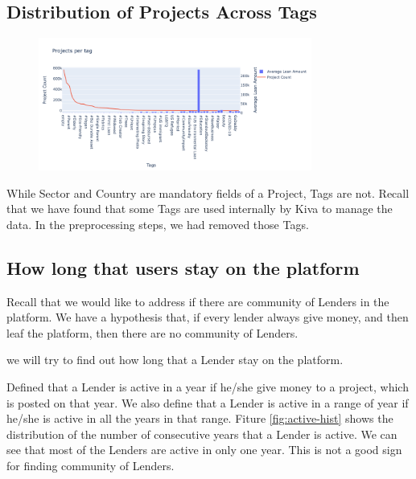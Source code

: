 \subsection{Distribution of Projects Across Tags}

\begin{figure}[H]
	\centering
	\includegraphics[width=0.8\textwidth]{images/project-vs-tag.png}
	\caption{}
	\label{fig:project-vs-tag}
\end{figure}



While Sector and Country are mandatory fields of a Project, Tags are not.
Recall that we have found that some Tags are used internally by Kiva to manage the data.
In the preprocessing steps, we had removed those Tags.


\subsection{How long that users stay on the platform}

Recall that we would like to address if there are community of Lenders in the platform.
We have a hypothesis that, if every lender always give money, and then leaf the platform,
then there are no community of Lenders.

we will try to find out how long that a Lender stay on the platform.

Defined that a Lender is active in a year if he/she give money to a project, which is posted on that year.
We also define that a Lender is active in a range of year if he/she is active in all the years in that range.
Fiture \ref{fig:active-hist} shows the distribution of the number of consecutive years that a Lender is active.
We can see that most of the Lenders are active in only one year.
This is not a good sign for finding community of Lenders.


